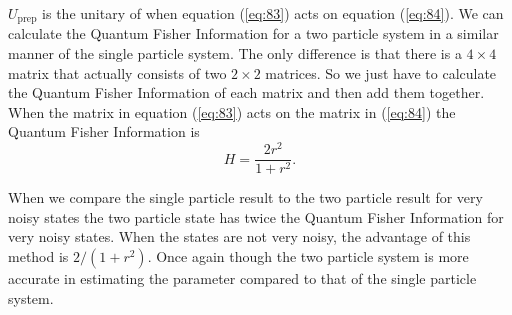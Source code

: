 \documentclass[twocolumn]{article}
\begin{document}
$U_{\text{prep}}$ is the unitary of when equation (\ref{eq:83}) acts on equation (\ref{eq:84}). We can calculate the Quantum Fisher Information for a two particle system in a similar manner of the single particle system. The only difference is that there is a $4\times4$ matrix that actually consists of two $2\times2$ matrices. So we just have to calculate the Quantum Fisher Information of each matrix and then add them together. When the matrix in equation (\ref{eq:83}) acts on the matrix in (\ref{eq:84}) the Quantum Fisher Information is
\begin{equation} \label{eq:85}
H=\frac{2r^2}{1+r^2}.
\end{equation}

When we compare the single particle result to the two particle result for very noisy states the two particle state has twice the Quantum Fisher Information for very noisy states. When the states are not very noisy, the advantage of this method is $2/(1+r^2)$. Once again though the two particle system is more accurate in estimating the parameter compared to that of the single particle system. 
\end{document}

